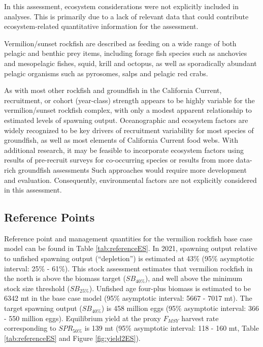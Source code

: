 \documentclass[11pt,
  english,
]{article}
\begin{document}
In this assessment, ecosystem considerations were not explicitly included in analyses. This is primarily due to a lack of relevant data that could contribute ecosystem-related quantitative information for the assessment.

Vermilion/sunset rockfish are described as feeding on a wide range of both pelagic and benthic prey items, including forage fish species such as anchovies and mesopelagic fishes, squid, krill and octopus, as well as sporadically abundant pelagic organisms such as pyrosomes, salps and pelagic red crabs.

As with most other rockfish and groundfish in the California Current, recruitment, or cohort (year-class) strength appears to be highly variable for the vermilion/sunset rockfish complex, with only a modest apparent relationship to estimated levels of spawning output. Oceanographic and ecosystem factors are widely recognized to be key drivers of recruitment variability for most species of groundfish, as well as most elements of California Current food webs. With additional research, it may be feasible to incorporate ecosystem factors using results of pre-recruit surveys for co-occurring species or results from more data-rich groundfish assessments Such approaches would require more development and evaluation. Consequently, environmental factors are not explicitly considered in this assessment.

\FloatBarrier


\hypertarget{reference-points}{%
\subsection*{Reference Points}\label{reference-points}}

\leavevmode\tagmcend\tagstructend

Reference point and management quantities for the vermilion rockfish base case model can be found in Table \ref{tab:referenceES}. In 2021, spawning output relative to unfished spawning output (``depletion'') is estimated at 43\% (95\% asymptotic interval: 25\% - 61\%). This stock assessment estimates that vermilion rockfish in the north is above the biomass target ({\(SB_{40\%}\)\leavevmode\tagmcend\tagstructend}), and well above the minimum stock size threshold ({\(SB_{25\%}\)\leavevmode\tagmcend\tagstructend}). Unfished age four-plus biomass is estimated to be 6342 mt in the base case model (95\% asymptotic interval: 5667 - 7017 mt). The target spawning output ({\(SB_{40\%}\)\leavevmode\tagmcend\tagstructend}) is 458 million eggs (95\% asymptotic interval: 366 - 550 million eggs). Equilibrium yield at the proxy {\(F_{MSY}\)\leavevmode\tagmcend\tagstructend} harvest rate corresponding to {\(SPR_{50\%}\)\leavevmode\tagmcend\tagstructend} is 139 mt (95\% asymptotic interval: 118 - 160 mt, Table \ref{tab:referenceES} and Figure \ref{fig:yield2ES}).
\end{document}
